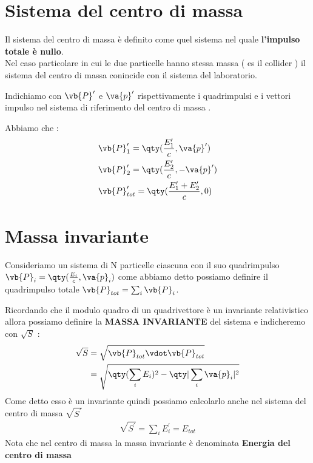 \documentclass[a4paper, 12pt, twoside]{report}
\begin{document}
\section{Sistema del centro di massa}
Il sistema del centro di massa è definito come quel sistema nel quale \textbf{l'impulso totale è nullo}.\\
Nel caso particolare in cui le due particelle hanno stessa massa ( es il collider ) il sistema del centro di massa conincide con il sistema del laboratorio. \\
\begin{tcolorbox}[colback=red!5!white,colframe=red!50!black,title=ATTENZIONE !]
        Indichiamo con $\vb{P}^{\prime}$ e $\va{p}^{\prime}$ rispettivamente i quadrimpulsi e i vettori impulso nel sistema di riferimento del centro di massa .
\end{tcolorbox}
\newpage
Abbiamo che : 
\begin{align*}
    &\vb{P}^{\prime}_1 = \qty(\frac{E^{\prime}_1}{c}, \va{p}^{\prime}) \\
    &\vb{P}^{\prime}_2 = \qty(\frac{E^{\prime}_2}{c}, -\va{p}^{\prime}) \\
    &\vb{P}^{\prime}_{tot} = \qty(\frac{E^{\prime}_1 +  E^{\prime}_2}{c}, 0) \end{align*}
\section{Massa invariante}
Consideriamo un sistema di N particelle ciascuna con il suo quadrimpulso $\vb{P}_{i} = \qty(\frac{E_{i}}{c},\va{p}_{i})$ come abbiamo detto 
possiamo definire il quadrimpulso totale $\vb{P}_{tot} = \sum_i \vb{P}_{i}$. \\
\begin{tcolorbox}[colback=red!5!white,colframe=red!50!black,title=ATTENZIONE !]
Ricordando che il modulo quadro di un quadrivettore è un invariante relativistico allora possiamo definire la \textbf{MASSA INVARIANTE} del sistema 
e indicheremo con $\sqrt{S}$ : 
\begin{align*}
    \sqrt{S} &= \sqrt{\vb{P}_{tot} \vdot \vb{P}_{tot}} \\
             &= \sqrt{\qty(\sum_i E_{i})^2 - \qty|\sum_i \va{p}_{i}|^2 }
\end{align*}
Come detto esso è un invariante quindi possiamo calcolarlo anche nel sistema del centro di massa $\sqrt{S^{\prime}}$
\begin{align*}
        \sqrt{S^{\prime}} = \sum_i E^{\prime}_{i} = E_{tot}
\end{align*}
Nota che nel centro di massa la massa invariante è denominata \textbf{Energia del centro di massa}
\end{tcolorbox}
\end{document}
